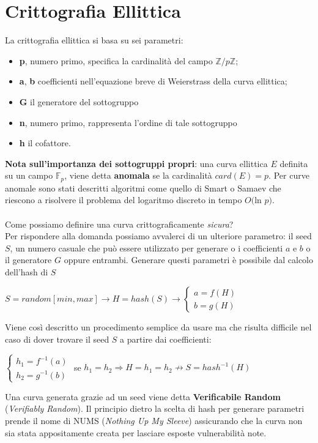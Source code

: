 \documentclass[a4paper,12pt]{tesiinfo}
\begin{document}
\section{Crittografia Ellittica}
La crittografia ellittica si basa su sei parametri:
\begin{itemize}
 \item \textbf{p}, numero primo, specifica la cardinalit\`a del campo $\mathbb{Z}/p\mathbb{Z}$;
 \item \textbf{a}, \textbf{b} coefficienti nell'equazione breve di Weierstrass della curva ellittica;
 \item \textbf{G} il generatore del sottogruppo
 \item \textbf{n}, numero primo, rappresenta l'ordine di tale sottogruppo
 \item \textbf{h} il cofattore.
\end{itemize}
\textbf{Nota sull'importanza dei sottogruppi propri}: una curva ellittica $E$ definita su un campo $\mathbb{F}_p$, viene detta \textbf{anomala} se la cardinalit\`a $card(E) = p$. Per curve anomale sono stati descritti algoritmi come quello di Smart o Samaev che riescono a risolvere il problema del logaritmo discreto in tempo $O($ln $p)$.
\\
\\
Come possiamo definire una curva crittograficamente \textit{sicura}?
\\
Per rispondere alla domanda possiamo avvalerci di un ulteriore parametro: il seed $S$, un numero casuale che pu\`o essere utilizzato per generare o i coefficienti $a$ e $b$ o il generatore $G$ oppure entrambi. Generare questi parametri \`e possibile dal calcolo dell'hash di $S$
\begin{center}
 $S = random[min, max] \to H = hash(S) \to 
 \begin{cases}
  a = f(H)\\
  b = g(H)
 \end{cases}$
\end{center}
Viene cos\`i descritto un procedimento semplice da usare ma che risulta difficile nel caso di dover trovare il seed $S$ a partire dai coefficienti:
\begin{center}
$
\begin{cases}
 h_1 = f^{-1} (a)\\
 h_2 = g^{-1} (b)
\end{cases}$ se 
$h_1 = h_2 \Rightarrow H=h_1=h_2 \nrightarrow S=hash^{-1} (H)$
\end{center}
Una curva generata grazie ad un seed viene detta \textbf{Verificabile Random} (\textit{Verifiably Random}). Il principio dietro la scelta di hash per generare parametri prende il nome di NUMS (\textit{Nothing Up My Sleeve}) assicurando che la curva non sia stata appositamente creata per lasciare esposte vulnerabilit\`a note.
%
%
\end{document}
